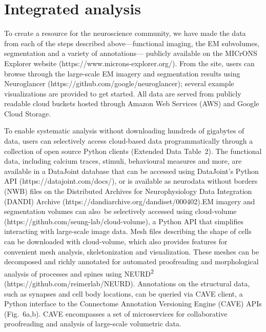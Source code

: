 \documentclass{article}
\begin{document}
\section*{Integrated analysis}

To create a resource for the neuroscience community, we have made the data from each of the steps described above—functional imaging, the EM subvolumes, segmentation and a variety of annotations— publicly available on the MICrONS Explorer website (https://www.microns-explorer.org/). From the site, users can browse through the large-scale EM imagery and segmentation results using Neuroglancer (https://github.com/google/neuroglancer); several example visualizations are provided to get started. All data are served from publicly readable cloud buckets hosted through Amazon Web Services (AWS) and Google Cloud Storage.

To enable systematic analysis without downloading hundreds of gigabytes of data, users can selectively access cloud-based data programmatically through a collection of open source Python clients (Extended Data Table~2). The functional data, including calcium traces, stimuli, behavioural measures and more, are available in a DataJoint database that can be accessed using DataJoint’s Python API (https://datajoint.com/docs/), or is available as neurodata without borders (NWB) files on the Distributed Archives for Neurophysiology Data Integration (DANDI) Archive (https://dandiarchive.org/dandiset/000402).EM imagery and segmentation volumes can also~be selectively accessed using cloud-volume (https://github.com/seung-lab/cloud-volume), a Python API that simplifies interacting with large-scale image data. Mesh files describing the shape of cells can be downloaded with cloud-volume, which also provides features for convenient mesh analysis, skeletonization and visualization. These meshes can be decomposed and richly annotated for automated proofreading and morphological analysis of processes and spines using NEURD\textsuperscript{2} (https://github.com/reimerlab/NEURD). Annotations on the structural data, such as synapses and cell body locations, can be queried via CAVE client, a Python interface to the Connectome Annotation Versioning Engine (CAVE) APIs (Fig.~6a,b). CAVE encompasses a set of microservices for collaborative proofreading and analysis of large-scale volumetric data.
\end{document}

